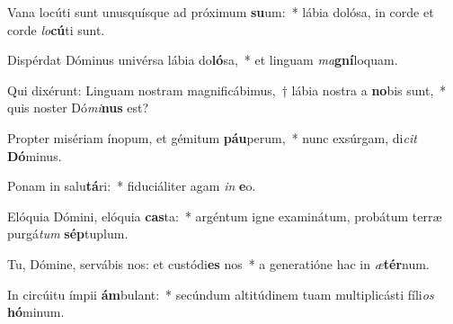 \item Vana locúti sunt unusquísque ad próximum \textbf{su}um:~* lábia dolósa, in corde et corde \textit{lo}\textbf{cú}ti sunt.
\item Dispérdat Dóminus univérsa lábia do\textbf{ló}sa,~* et linguam \textit{ma}\textbf{gní}loquam.
\item Qui dixérunt: Linguam nostram magnificábimus,~† lábia nostra a \textbf{no}bis sunt,~* quis noster Dó\textit{mi}\textbf{nus} est?
\item Propter misériam ínopum, et gémitum \textbf{páu}perum,~* nunc exsúrgam, di\textit{cit} \textbf{Dó}minus.
\item Ponam in salu\textbf{tá}ri:~* fiduciáliter agam \textit{in} \textbf{e}o.
\item Elóquia Dómini, elóquia \textbf{cas}ta:~* argéntum igne examinátum, probátum terræ purgá\textit{tum} \textbf{sép}tuplum.
\item Tu, Dómine, servábis nos: et custódi\textbf{es} nos~* a generatióne hac in \textit{æ}\textbf{tér}num.
\item In circúitu ímpii \textbf{ám}bulant:~* secúndum altitúdinem tuam multiplicásti fíli\textit{os} \textbf{hó}minum.
